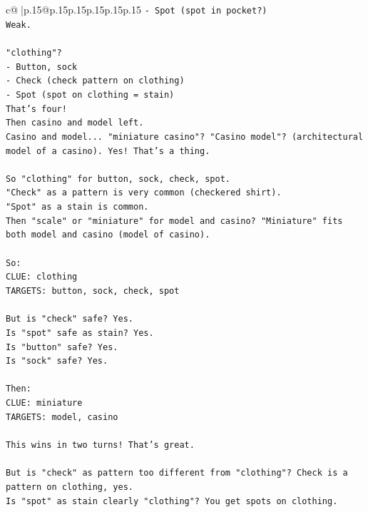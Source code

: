\documentclass{article}
\begin{document}
{\begin{supertabular}{c@{$\;$}|p{.15\linewidth}@{}p{.15\linewidth}p{.15\linewidth}p{.15\linewidth}p{.15\linewidth}p{.15\linewidth}}
{{{\texttt{{-} Spot (spot in pocket?)} \\
\texttt{Weak.} \\
\\ 
\texttt{"clothing"?} \\
\texttt{{-} Button, sock} \\
\texttt{{-} Check (check pattern on clothing)} \\
\texttt{{-} Spot (spot on clothing = stain)} \\
\texttt{That's four!} \\
\texttt{Then casino and model left.} \\
\texttt{Casino and model... "miniature casino"? "Casino model"? (architectural model of a casino). Yes! That's a thing.} \\
\\ 
\texttt{So "clothing" for button, sock, check, spot.} \\
\texttt{"Check" as a pattern is very common (checkered shirt).} \\
\texttt{"Spot" as a stain is common.} \\
\texttt{Then "scale" or "miniature" for model and casino? "Miniature" fits both model and casino (model of casino).} \\
\\ 
\texttt{So:} \\
\texttt{CLUE: clothing} \\
\texttt{TARGETS: button, sock, check, spot} \\
\\ 
\texttt{But is "check" safe? Yes.} \\
\texttt{Is "spot" safe as stain? Yes.} \\
\texttt{Is "button" safe? Yes.} \\
\texttt{Is "sock" safe? Yes.} \\
\\ 
\texttt{Then:} \\
\texttt{CLUE: miniature} \\
\texttt{TARGETS: model, casino} \\
\\ 
\texttt{This wins in two turns! That's great.} \\
\\ 
\texttt{But is "check" as pattern too different from "clothing"? Check is a pattern on clothing, yes.} \\
\texttt{Is "spot" as stain clearly "clothing"? You get spots on clothing.} \\
\\ 
}}}
\end{supertabular}}
\end{document}
